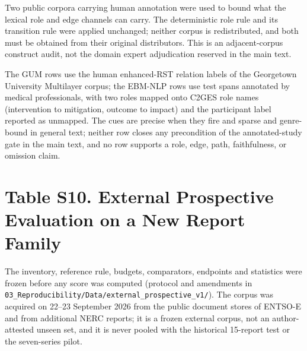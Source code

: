 \documentclass[11pt]{article}
\begin{document}
Two public corpora carrying human annotation were used to bound what the lexical role and edge channels can carry. The deterministic role rule and its transition rule were applied unchanged; neither corpus is redistributed, and both must be obtained from their original distributors. This is an adjacent-corpus construct audit, not the domain expert adjudication reserved in the main text.

\begin{center}
\small
{}
\end{center}

The GUM rows use the human enhanced-RST relation labels of the Georgetown University Multilayer corpus; the EBM-NLP rows use test spans annotated by medical professionals, with two roles mapped onto C2GES role names (intervention to mitigation, outcome to impact) and the participant label reported as unmapped. The cues are precise when they fire and sparse and genre-bound in general text; neither row closes any precondition of the annotated-study gate in the main text, and no row supports a role, edge, path, faithfulness, or omission claim.

\section*{Table S10. External Prospective Evaluation on a New Report Family}

The inventory, reference rule, budgets, comparators, endpoints and statistics were frozen before any score was computed (protocol and amendments in \nolinkurl{03_Reproducibility/Data/external_prospective_v1/}). The corpus was acquired on 22--23 September 2026 from the public document stores of ENTSO-E and from additional NERC reports; it is a frozen external corpus, not an author-attested unseen set, and it is never pooled with the historical 15-report test or the seven-series pilot.
\end{document}
